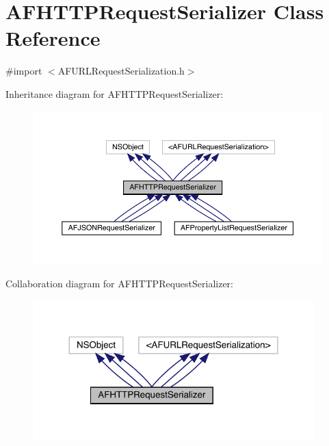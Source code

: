 \hypertarget{interface_a_f_h_t_t_p_request_serializer}{}\section{A\+F\+H\+T\+T\+P\+Request\+Serializer Class Reference}
\label{interface_a_f_h_t_t_p_request_serializer}


{\ttfamily \#import $<$A\+F\+U\+R\+L\+Request\+Serialization.\+h$>$}



Inheritance diagram for A\+F\+H\+T\+T\+P\+Request\+Serializer\+:\nopagebreak
\begin{figure}[H]
\begin{center}
\leavevmode
\includegraphics[width=350pt]{interface_a_f_h_t_t_p_request_serializer__inherit__graph}
\end{center}
\end{figure}


Collaboration diagram for A\+F\+H\+T\+T\+P\+Request\+Serializer\+:\nopagebreak
\begin{figure}[H]
\begin{center}
\leavevmode
\includegraphics[width=308pt]{interface_a_f_h_t_t_p_request_serializer__coll__graph}
\end{center}
\end{figure}
